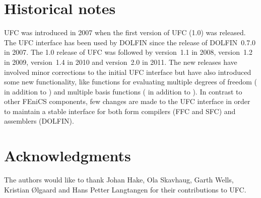 \section{Historical notes}

UFC was introduced in 2007 when the first version of UFC (1.0) was
released. The UFC interface has been used by DOLFIN since the release
of DOLFIN~0.7.0 in 2007. The 1.0 release of UFC was followed by
version~1.1 in 2008, version~1.2 in 2009, version~1.4 in 2010 and version~2.0 in 2011. The
new releases have involved minor corrections to the initial UFC
interface but have also introduced some new functionality, like
functions for evaluating multiple degrees of freedom
( in addition to ) and multiple
basis functions ( in addition to
). In contrast to other FEniCS components, few
changes are made to the UFC interface in order to maintain a stable
interface for both form compilers (FFC and SFC) and assemblers
(DOLFIN).

\section*{Acknowledgments}

The authors would like to thank Johan Hake, Ola Skavhaug, Garth Wells,
Kristian \O{}lgaard and Hans Petter Langtangen for their contributions
to UFC.
